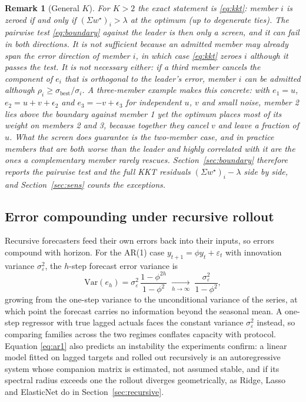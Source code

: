 \documentclass[journal]{IEEEtran}
\newtheorem{remark}{Remark}
\begin{document}
\begin{remark}[General $K$]
\label{rem:generalK}
For $K > 2$ the exact statement is \eqref{eq:kkt}: member $i$ is zeroed if and only if $(\Sigma w^{\star})_i > \lambda$ at the optimum (up to degenerate ties). The pairwise test \eqref{eq:boundary} against the leader is then only a screen, and it can fail in both directions. It is not sufficient because an admitted member may already span the error direction of member $i$, in which case \eqref{eq:kkt} zeroes $i$ although it passes the test. It is not necessary either: if a third member cancels the component of $e_i$ that is orthogonal to the leader's error, member $i$ can be admitted although $\rho_i \geq \sigma_{\mathrm{best}}/\sigma_i$. A three-member example makes this concrete: with $e_1 = u$, $e_2 = u + v + \epsilon_2$ and $e_3 = -v + \epsilon_3$ for independent $u$, $v$ and small noise, member 2 lies above the boundary against member 1 yet the optimum places most of its weight on members 2 and 3, because together they cancel $v$ and leave a fraction of $u$. What the screen does guarantee is the two-member case, and in practice members that are both worse than the leader and highly correlated with it are the ones a complementary member rarely rescues. Section~\ref{sec:boundary} therefore reports the pairwise test and the full KKT residuals $(\Sigma w^{\star})_i - \lambda$ side by side, and Section~\ref{sec:sens} counts the exceptions.
\end{remark}

\subsection{Error compounding under recursive rollout}
Recursive forecasters feed their own errors back into their inputs, so errors compound with horizon. For the AR(1) case $y_{t+1} = \phi y_t + \varepsilon_t$ with innovation variance $\sigma_{\varepsilon}^2$, the $h$-step forecast error variance is
\begin{equation}
\mathrm{Var}(e_h) = \sigma_{\varepsilon}^2\, \frac{1 - \phi^{2h}}{1 - \phi^2}
\;\xrightarrow[h \to \infty]{}\;
\frac{\sigma_{\varepsilon}^2}{1 - \phi^2},
\label{eq:ar1}
\end{equation}
growing from the one-step variance to the unconditional variance of the series, at which point the forecast carries no information beyond the seasonal mean. A one-step regressor with true lagged actuals faces the constant variance $\sigma_{\varepsilon}^2$ instead, so comparing families across the two regimes conflates capacity with protocol. Equation \eqref{eq:ar1} also predicts an instability the experiments confirm: a linear model fitted on lagged targets and rolled out recursively is an autoregressive system whose companion matrix is estimated, not assumed stable, and if its spectral radius exceeds one the rollout diverges geometrically, as Ridge, Lasso and ElasticNet do in Section~\ref{sec:recursive}.
\end{document}
